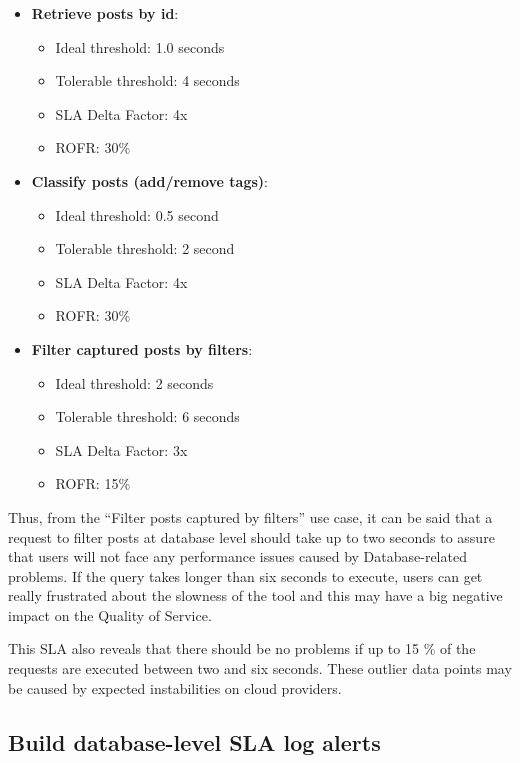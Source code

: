 \begin{itemize}
\item{
\textbf{Retrieve posts by id}:
	\begin{itemize}
		\item{Ideal threshold: 1.0 seconds}
		\item{Tolerable threshold: 4 seconds}
		\item{SLA Delta Factor: 4x}
		\item{ROFR: 30\%}
	\end{itemize}
}
\item{

\textbf{Classify posts (add/remove tags)}:
	\begin{itemize}
		\item{Ideal threshold: 0.5 second}
		\item{Tolerable threshold: 2 second}
		\item{SLA Delta Factor: 4x}
		\item{ROFR: 30\%}
	\end{itemize}
}

\item{
	\textbf{Filter captured posts by filters}:
	\begin{itemize}
		\item{Ideal threshold: 2 seconds}
		\item{Tolerable threshold: 6 seconds}
		\item{SLA Delta Factor: 3x}
		\item{ROFR: 15\%}
	\end{itemize}
}
\end{itemize}

Thus, from the ``Filter posts captured by filters'' use case, it can be said that a request to filter posts at database level should take up to two seconds to assure that users will not face any performance issues caused by Database-related problems. If the query takes longer than six seconds to execute, users can get really frustrated about the slowness of the tool and this may have a big negative impact on the Quality of Service. 

This SLA also reveals that there should be no problems if up to 15 \% of the requests are executed between two and six seconds. These outlier data points may be caused by expected instabilities on cloud providers. 

\subsection{Build database-level SLA log alerts}

